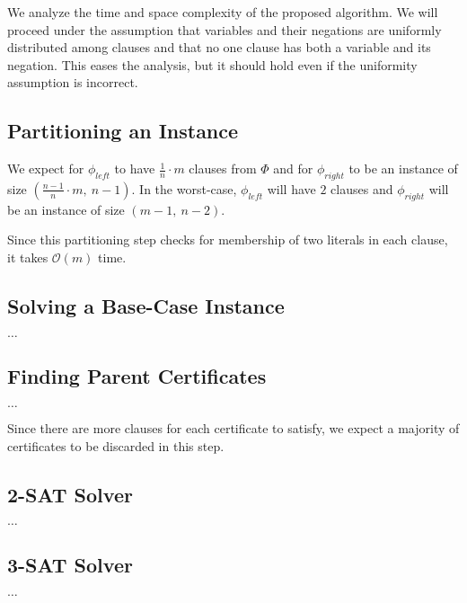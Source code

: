We analyze the time and space complexity of the proposed algorithm.
We will proceed under the assumption that variables and their negations are uniformly distributed among clauses and that no one clause has both a variable and its negation.
This eases the analysis, but it should hold even if the uniformity assumption is incorrect.


\subsection{Partitioning an Instance}
\label{subsec:partitioning-an-instance2}

We expect for $\phi_{left}$ to have $\frac{1}{n} \cdot m$ clauses from $\Phi$ and for $\phi_{right}$ to be an instance of size $(\frac{n - 1}{n} \cdot m,~ n - 1)$.
In the worst-case, $\phi_{left}$ will have $2$ clauses and $\phi_{right}$ will be an instance of size $(m - 1,~ n - 2)$.

Since this partitioning step checks for membership of two literals in each clause, it takes $\mathcal{O}(m)$ time.


\subsection{Solving a Base-Case Instance}
\label{subsec:solving-a-base-case-instance2}

$\dots$


\subsection{Finding Parent Certificates}
\label{subsec:finding-parent-certificates2}

$\dots$

Since there are more clauses for each certificate to satisfy, we expect a majority of certificates to be discarded in this step.


\subsection{2-SAT Solver}
\label{subsec:2-sat-solver2}

$\dots$


\subsection{3-SAT Solver}
\label{subsec:3-sat-solver2}

$\dots$
